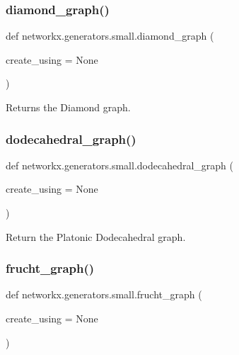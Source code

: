\subsubsection{\texorpdfstring{diamond\+\_\+graph()}{diamond\_graph()}}
{\footnotesize\ttfamily def networkx.\+generators.\+small.\+diamond\+\_\+graph (\begin{DoxyParamCaption}\item[{}]{create\+\_\+using = {\ttfamily None} }\end{DoxyParamCaption})}

\begin{DoxyVerb}Returns the Diamond graph.\end{DoxyVerb}
 \mbox{\label{namespacenetworkx_1_1generators_1_1small_a187043f9bfc0c9d8519fe89a3cd2459b}} 
\subsubsection{\texorpdfstring{dodecahedral\+\_\+graph()}{dodecahedral\_graph()}}
{\footnotesize\ttfamily def networkx.\+generators.\+small.\+dodecahedral\+\_\+graph (\begin{DoxyParamCaption}\item[{}]{create\+\_\+using = {\ttfamily None} }\end{DoxyParamCaption})}

\begin{DoxyVerb}Return the Platonic Dodecahedral graph.\end{DoxyVerb}
 \mbox{\label{namespacenetworkx_1_1generators_1_1small_ad0d5d48cbff4f6b8988dddd984e41532}} 
\subsubsection{\texorpdfstring{frucht\+\_\+graph()}{frucht\_graph()}}
{\footnotesize\ttfamily def networkx.\+generators.\+small.\+frucht\+\_\+graph (\begin{DoxyParamCaption}\item[{}]{create\+\_\+using = {\ttfamily None} }\end{DoxyParamCaption})}


